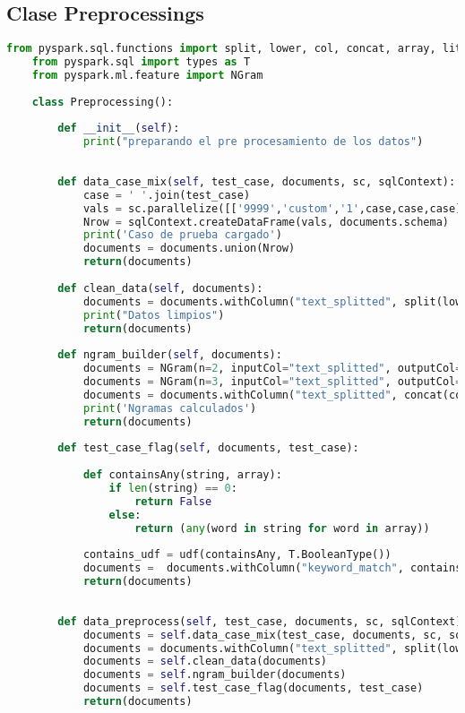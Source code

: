 \documentclass[12pt]{article}
\begin{document}
	\subsection{Clase Preprocessings}
	\begin{lstlisting}[language=Python, caption = Clase Preprocessings]
	from pyspark.sql.functions import split, lower, col, concat, array, lit, udf
	from pyspark.sql import types as T
	from pyspark.ml.feature import NGram
	
	class Preprocessing():
	    
	    def __init__(self):
	        print("preparando el pre procesamiento de los datos")
	        
	    
	    def data_case_mix(self, test_case, documents, sc, sqlContext):
	        case = ' '.join(test_case)
	        vals = sc.parallelize([['9999','custom','1',case,case,case]])
	        Nrow = sqlContext.createDataFrame(vals, documents.schema)
	        print('Caso de prueba cargado')
	        documents = documents.union(Nrow)
	        return(documents)
	    
	    def clean_data(self, documents):
	        documents = documents.withColumn("text_splitted", split(lower(col("articuloLimpio")), " "))
	        print("Datos limpios")
	        return(documents)
	    
	    def ngram_builder(self, documents):
	        documents = NGram(n=2, inputCol="text_splitted", outputCol="ngrams2").transform(documents)
	        documents = NGram(n=3, inputCol="text_splitted", outputCol="ngrams3").transform(documents)
	        documents = documents.withColumn("text_splitted", concat(col("text_splitted"),col("ngrams2"),col("ngrams3")))
	        print('Ngramas calculados')
	        return(documents)
	    
	    def test_case_flag(self, documents, test_case):
	        
	        def containsAny(string, array):
	            if len(string) == 0:
	                return False
	            else:
	                return (any(word in string for word in array))
	        
	        contains_udf = udf(containsAny, T.BooleanType())
	        documents =  documents.withColumn("keyword_match", contains_udf(col("text_splitted"), array([lit(i) for i in test_case])))
	        return(documents)
	    
	    
	    def data_preprocess(self, test_case, documents, sc, sqlContext):
	        documents = self.data_case_mix(test_case, documents, sc, sqlContext)
	        documents = documents.withColumn("text_splitted", split(lower(col("articuloLimpio")), " "))
	        documents = self.clean_data(documents)
	        documents = self.ngram_builder(documents)
	        documents = self.test_case_flag(documents, test_case)
	        return(documents)
	\end{lstlisting}
	
\end{document}
